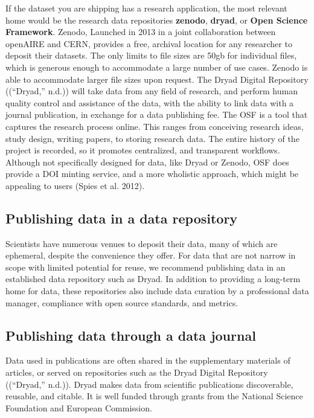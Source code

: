 \documentclass[
]{article}
\begin{document}
If the dataset you are shipping has a research application, the most relevant home would be the research data repositories \textbf{zenodo}, \textbf{dryad}, or \textbf{Open Science Framework}. Zenodo, Launched in 2013 in a joint collaboration between openAIRE and CERN, provides a free, archival location for any researcher to deposit their datasets. The only limits to file sizes are 50gb for individual files, which is generous enough to accommodate a large number of use cases. Zenodo is able to accommodate larger file sizes upon request. The Dryad Digital Repository ((``Dryad,'' n.d.)) will take data from any field of research, and perform human quality control and assistance of the data, with the ability to link data with a journal publication, in exchange for a data publishing fee. The OSF is a tool that captures the research process online. This ranges from conceiving research ideas, study design, writing papers, to storing research data. The entire history of the project is recorded, so it promotes centralized, and transparent workflows. Although not specifically designed for data, like Dryad or Zenodo, OSF does provide a DOI minting service, and a more wholistic approach, which might be appealing to users (Spies et al. 2012).

\hypertarget{publishing-data-in-a-data-repository}{%
\subsection{Publishing data in a data repository}\label{publishing-data-in-a-data-repository}}

Scientists have numerous venues to deposit their data, many of which are ephemeral, despite the convenience they offer. For data that are not narrow in scope with limited potential for reuse, we recommend publishing data in an established data repository such as Dryad. In addition to providing a long-term home for data, these repositories also include data curation by a professional data manager, compliance with open source standards, and metrics.

\hypertarget{publishing-data-through-a-data-journal}{%
\subsection{Publishing data through a data journal}\label{publishing-data-through-a-data-journal}}

Data used in publications are often shared in the supplementary materials of articles, or served on repositories such as the Dryad Digital Repository ((``Dryad,'' n.d.)). Dryad makes data from scientific publications discoverable, reusable, and citable. It is well funded through grants from the National Science Foundation and European Commission.
\end{document}
